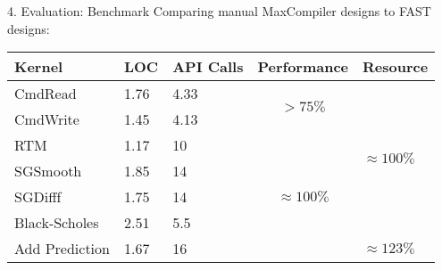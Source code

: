 \begin{comment}
\begin{frame}{4. Evaluation: Reverse Time Migration}
  \begin{table}
  \end{table}
\end{frame}
\end{comment}

\begin{frame}{4. Evaluation: Benchmark}
  Comparing manual MaxCompiler designs to FAST designs:
  \begin{table}
    \renewcommand{\arraystretch}{1.2}
    \begin{tabular}{l|p{1cm}|p{1cm}|c|p{2cm}}
      \textbf{Kernel} & \textbf{LOC} & \textbf{API Calls} & \textbf{Performance}              & \textbf{Resource}
      \\
      \hline\hline
      CmdRead         & 1.76               & 4.33                     & \multirow{2}{*}{$ > 75\%$}        & \multirow{6}{3cm}{$\approx 100\%$} \\
      CmdWrite        & 1.45               & 4.13                     &                                   &                              \\
      \cline{1-4}
      RTM             & 1.17               & 10                       & \multirow{5}{*}{$ \approx 100\%$} &                              \\
      SGSmooth        & 1.85               & 14                       &                                   &                              \\
      SGDifff         & 1.75               & 14                       &                                   &                              \\
      Black-Scholes   & 2.51               & 5.5                      &                                   &                              \\
      \cline{5-5}
      Add Prediction  & 1.67               & 16                       &                                   &    $ \approx 123 \% $                          \\
    \end{tabular}
  \end{table}

\end{frame}